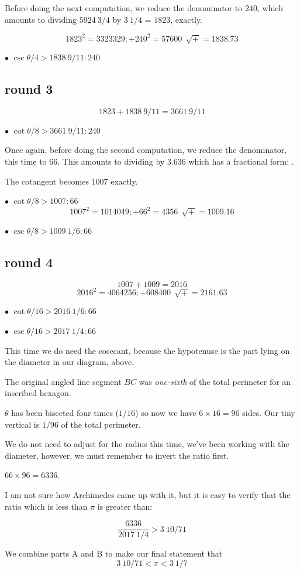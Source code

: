 \documentclass[11pt, oneside]{article}
\begin{document}
Before doing the next computation, we reduce the denominator to $240$, which amounts to dividing $5924 \ 3/4$ by $3 \ 1/4$ = $1823$, exactly.

\[ 1823^2 = 3323329;  + 240^2 = 57600 \ \ \sqrt{+} = 1838.73 \]

$\bullet$  $\csc \theta/4 > 1838 \ 9/11: 240$

\subsection*{round 3}
\[ 1823 + 1838 \ 9/11 = 3661 \ 9/11 \]

$\bullet$  $\cot \theta/8 > 3661 \ 9/11 : 240$ 

Once again, before doing the second computation, we reduce the denominator, this time to $66$.  This amounts to dividing by $3.636$ which has a fractional form:  .

The cotangent becomes 1007 exactly.

$\bullet$  $\cot \theta/8 > 1007 : 66$ 
\[ 1007^2 = 1014049;  + 66^2 = 4356 \ \ \sqrt{+} = 1009.16 \]

$\bullet$  $\csc \theta/8 > 1009 \ 1/6 : 66$

\subsection*{round 4}
\[ 1007 + 1009 = 2016 \]
\[ 2016^2 = 4064256;  + 608400 \ \ \sqrt{+} = 2161.63 \]

$\bullet$  $\cot \theta/16 > 2016 \ 1/6 : 66$ 

$\bullet$  $\csc \theta/16 > 2017 \ 1/4: 66$

This time we do need the cosecant, because the hypotenuse is the part lying on the diameter in our diagram, above.

The original angled line segment $BC$ was \emph{one-sixth} of the total perimeter for an inscribed hexagon.

$\theta$ has been bisected four times ($1/16$) so now we have $6 \times 16 = 96$ sides.  Our tiny vertical is $1/96$ of the total perimeter.

We do not need to adjust for the radius this time, we've been working with the diameter, however, we must remember to invert the ratio first.

$66 \times 96 = 6336$.

I am not sure how Archimedes came up with it, but it is easy to verify that the ratio which is less than $\pi$ is greater than:

\[ \frac{6336}{2017 \ 1/4} > 3 \ 10/71 \]

We combine parts A and B to make our final statement that
\[ 3 \ 10/71 < \pi < 3 \ 1/7 \]
\end{document}
